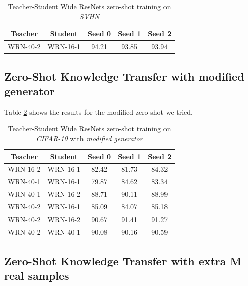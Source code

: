 \begin{table}[!h]
    \centering
    \begin{tabular}{cc|ccc}
    \toprule
    \toprule
         \textbf{Teacher} & \textbf{Student} & \textbf{Seed 0} & \textbf{Seed 1} & \textbf{Seed 2} \\
         \midrule
         WRN-40-2 & WRN-16-1 & 94.21 & 93.85 & 93.94 \\
         \bottomrule
         \bottomrule
    \end{tabular}
    \vspace{0.25cm}
    \caption{Teacher-Student Wide ResNets zero-shot training on \textit{SVHN}}
    \label{tab:zero_shot_svhn}

\end{table}


\subsection{Zero-Shot Knowledge Transfer with modified generator}

Table \ref{tab:zeroShot_modified} shows the results for the modified zero-shot we tried.


\begin{table}[!h]
    \centering
    \begin{tabular}{cc|ccc}
    \toprule
    \toprule
         \textbf{Teacher} & \textbf{Student} & \textbf{Seed 0} & \textbf{Seed 1} & \textbf{Seed 2} \\
         \midrule
         WRN-16-2 & WRN-16-1 & 82.42 & 81.73 & 84.32 \\
         WRN-40-1 & WRN-16-1 & 79.87 & 84.62 & 83.34\\
         WRN-40-1 & WRN-16-2 & 88.71 & 90.11 & 88.99 \\
         WRN-40-2 & WRN-16-1 & 85.09 & 84.07 & 85.18 \\
         WRN-40-2 & WRN-16-2 & 90.67 & 91.41 & 91.27 \\ 
         WRN-40-2 & WRN-40-1 & 90.08 & 90.16 & 90.59 \\
         \bottomrule
         \bottomrule
    \end{tabular}
    \vspace{0.25cm}
    \caption{Teacher-Student Wide ResNets zero-shot training on \textit{CIFAR-10} with \textit{modified generator}}
    \label{tab:zeroShot_modified}

\end{table}
\newpage
\subsection{Zero-Shot Knowledge Transfer with extra M real samples}


